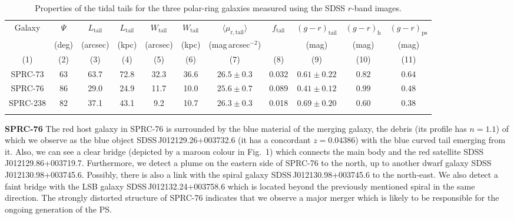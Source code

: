 \documentclass{raa}
\begin{document}
\begin{table}
\bc
\begin{minipage}[]{0.86\textwidth}
\caption[]{Properties of the tidal tails for the three polar-ring galaxies measured using the SDSS $r$-band images.\label{tab:streams}}\end{minipage}
\setlength{\tabcolsep}{1pt}
\small
  \begin{tabular}{ccccccccccc}
  \hline\noalign{\smallskip}
   Galaxy  & $\Psi$ & $L_\mathrm{tail}$ & $L_\mathrm{tail}$& $W_\mathrm{tail}$& $W_\mathrm{tail}$ &  $\langle \mu_\mathrm{r,tail} \rangle$ & $f_\mathrm{tail}$ & $(g-r)_\mathrm{tail}$ & $(g-r)_\mathrm{h}$ & $(g-r)_\mathrm{ps}$  \\ 
           &    (deg)&   (arcsec)  & (kpc) & (arcsec) & (kpc) &  (mag\,arcsec$^{-2}$) & & (mag) & (mag) & (mag)                \\
    (1)    & (2)         & (3)   & (4)   &  (5)     & (6) & (7) & (8) & (9) & (10) & (11)   \\
\hline\noalign{\smallskip}
SPRC-73    & 63 & 63.7 & 72.8 & 32.3 & 36.6 & $26.5\pm0.3$ & 0.032 & $0.61\pm0.22$ & $0.82$ & $0.64$\tabularnewline
SPRC-76    & 86 & 29.0 & 24.9 & 11.7 & 10.0 &  $25.6\pm0.7$ & 0.089 & $0.41\pm0.12$ & $0.99$ & $0.48$\tabularnewline
SPRC-238   & 82 & 37.1 & 43.1 & 9.2 & 10.7 & $26.3\pm0.3$ & 0.018 & $0.69\pm0.20$ & $0.60$ & $0.38$\tabularnewline
  \noalign{\smallskip}\hline
  \end{tabular}
  \ec
 \end{table} 


{\bf SPRC-76}
The red host galaxy in SPRC-76 is surrounded by the blue material of the merging galaxy,
the debris (its profile has $n=1.1$) of which we observe as the blue object SDSS\,J012129.26+003732.6 (it has a concordant $z=0.04386$) with the blue curved tail emerging from it. Also, we can see a clear bridge (depicted by a maroon colour in Fig.~1) which connects the main body and the red satellite SDSS\,J012129.86+003719.7. Furthermore, we detect a plume on the eastern side of SPRC-76 to the north, up to another dwarf galaxy SDSS\,J012130.98+003745.6. Possibly, there is also a link with the spiral galaxy SDSS\,J012130.98+003745.6 to the north-east. We also detect a faint bridge with the LSB galaxy SDSS\,J012132.24+003758.6 which is located beyond the previously mentioned spiral in the same direction. The strongly distorted structure of SPRC-76 indicates that we observe a major merger which is likely to be responsible for the ongoing generation of the PS.
\end{document}
